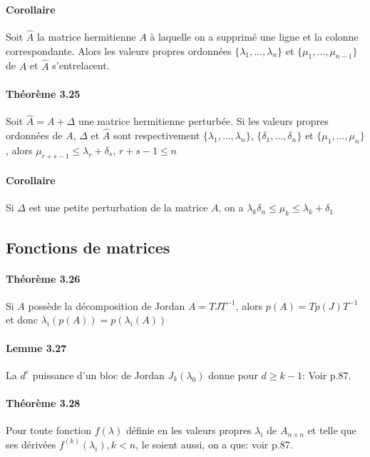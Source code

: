 \paragraph{Corollaire}Soit $\hat{A}$ la matrice hermitienne $A$ à laquelle on a supprimé une ligne et la colonne correspondante. Alors les valeurs propres ordonnées $\{\lambda_1,\dots,\lambda_n\}$ et $\{\mu_1,\dots,\mu_{n-1}\}$ de $A$ et $\hat{A}$ s'entrelacent.

\paragraph{Théorème 3.25} Soit $\hat{A} = A + \Delta$ une matrice hermitienne perturbée. Si les valeurs propres ordonnées de $A$, $\Delta$ et $\hat{A}$ sont respectivement $\{\lambda_1,\dots,\lambda_n\}$, $\{\delta_1,\dots,\delta_n\}$ et $\{\mu_1,\dots,\mu_n\}$, alors $\mu_{r+s-1} \leq \lambda_r + \delta_s$, $r+s-1 \leq n$

\paragraph{Corollaire} Si $\Delta$ est une petite perturbation de la matrice $A$, on a $ \lambda_k  \delta_n \leq \mu_k \leq \lambda_k + \delta_1$

\subsection{Fonctions de matrices}

\paragraph{Théorème 3.26} Si $A$ possède la décomposition de Jordan $A = TJT^{-1}$, alors $p(A) = Tp(J)T^{-1}$ et donc $\lambda_i(p(A)) = p(\lambda_i(A))$

\paragraph{Lemme 3.27} La $d^e$ puissance d'un bloc de Jordan $J_k(\lambda_0)$ donne pour $d \geq k-1$: Voir p.87.

\paragraph{Théorème 3.28} Pour toute fonction $f(\lambda)$ définie en les valeurs propres $\lambda_i$ de $A_{n\times n}$ et telle que ses dérivées $f^{(k)}(\lambda_i), k<n$, le soient aussi, on a que: voir p.87.

